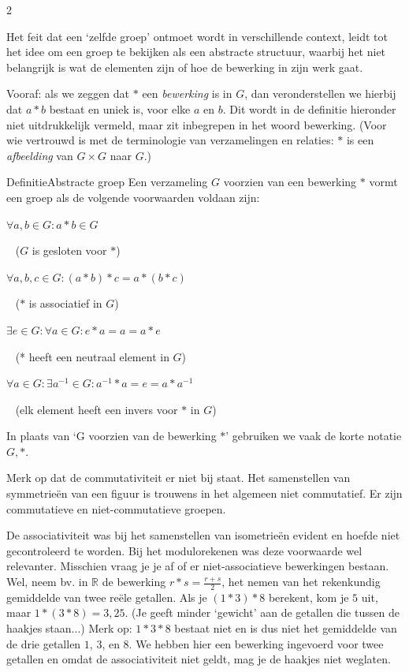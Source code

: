 \begin{multicols}{2}

	Het feit dat een `zelfde groep' ontmoet wordt in verschillende context, leidt tot het idee om een groep te bekijken als een abstracte structuur, waarbij het niet belangrijk is wat de elementen zijn of hoe de bewerking in zijn werk gaat.
	
	Vooraf: als we zeggen dat $*$ een \emph{bewerking} is in $G$, dan veronderstellen we hierbij dat $a*b$ bestaat en uniek is, voor elke $a$ en $b$. Dit wordt in de definitie hieronder niet uitdrukkelijk vermeld, maar zit inbegrepen in het woord bewerking. (Voor wie vertrouwd is met de terminologie van verzamelingen en relaties: $*$ is een \emph{afbeelding} van $G\times G$ naar $G$.)
	
	\begin{kader}{Definitie}{Abstracte groep}
		Een verzameling $G$ voorzien van een bewerking $*$ vormt een groep als de volgende voorwaarden voldaan zijn:
  
		$\forall a, b \in G: a*b\in G$
  
		$\;\;\;$($G$ is gesloten voor $*$)
  
		$\forall a, b, c \in G: (a*b)*c=a*(b*c)$
  
		$\;\;\;$($*$ is associatief in $G$)
  
		$\exists e \in G: \forall a \in G: e*a=a=a*e$
  
		$\;\;\;$(* heeft een neutraal element in $G$)
  
		$\forall a\in G: \exists a^{-1}\in G:   a^{-1}*a=e=a*a^{-1}$
  
		$\;\;\;$(elk element heeft een invers voor $*$ in $G$)
		\end{kader}
	
	In plaats van `G voorzien van de bewerking $*$' gebruiken we vaak de korte notatie $G,*$.
	
	Merk op dat de commutativiteit er niet bij staat. Het samenstellen van symmetrieën van een figuur is trouwens in het algemeen niet commutatief. Er zijn commutatieve en niet-commutatieve groepen.
	
	De associativiteit was bij het samenstellen van isometrieën evident en hoefde niet gecontroleerd te worden. Bij het modulorekenen was deze voorwaarde wel relevanter. Misschien vraag je je af of er niet-associatieve bewerkingen bestaan. Wel, neem bv. in $\mathbb{R}$ de bewerking $r*s=\frac{r+s}{2}$, het nemen van het rekenkundig gemiddelde van twee reële getallen. Als je $(1*3)*8$ berekent, kom je $5$ uit, maar $1*(3*8)=3,25$. (Je geeft minder `gewicht' aan de getallen die tussen de haakjes staan...) Merk op: $1*3*8$ bestaat niet en is dus niet het gemiddelde van de drie getallen $1$, $3$, en $8$. We hebben hier een bewerking ingevoerd voor twee getallen en omdat de associativiteit niet geldt, mag je de haakjes niet weglaten. 
	

\end{multicols}
